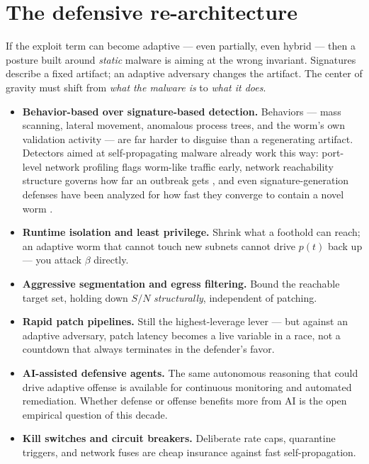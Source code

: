 \documentclass[11pt,a4paper]{article}
\begin{document}
\section{The defensive re-architecture}

If the exploit term can become adaptive --- even partially, even hybrid --- then a posture built around \emph{static} malware is aiming at the wrong invariant. Signatures describe a fixed artifact; an adaptive adversary changes the artifact. The center of gravity must shift from \emph{what the malware is} to \emph{what it does}.

\begin{itemize}[nosep]
  \item \textbf{Behavior-based over signature-based detection.} Behaviors --- mass scanning, lateral movement, anomalous process trees, and the worm's own validation activity --- are far harder to disguise than a regenerating artifact. Detectors aimed at self-propagating malware already work this way: port-level network profiling \cite{portfiler} flags worm-like traffic early, network reachability structure governs how far an outbreak gets \cite{resilience}, and even signature-generation defenses have been analyzed for how fast they converge to contain a novel worm \cite{sigconv}.
  \item \textbf{Runtime isolation and least privilege.} Shrink what a foothold can reach; an adaptive worm that cannot touch new subnets cannot drive $p(t)$ back up --- you attack $\beta$ directly.
  \item \textbf{Aggressive segmentation and egress filtering.} Bound the reachable target set, holding down $S/N$ \emph{structurally}, independent of patching.
  \item \textbf{Rapid patch pipelines.} Still the highest-leverage lever --- but against an adaptive adversary, patch latency becomes a live variable in a race, not a countdown that always terminates in the defender's favor.
  \item \textbf{AI-assisted defensive agents.} The same autonomous reasoning that could drive adaptive offense is available for continuous monitoring and automated remediation. Whether defense or offense benefits more from AI is the open empirical question of this decade.
  \item \textbf{Kill switches and circuit breakers.} Deliberate rate caps, quarantine triggers, and network fuses are cheap insurance against fast self-propagation.
\end{itemize}
\end{document}
